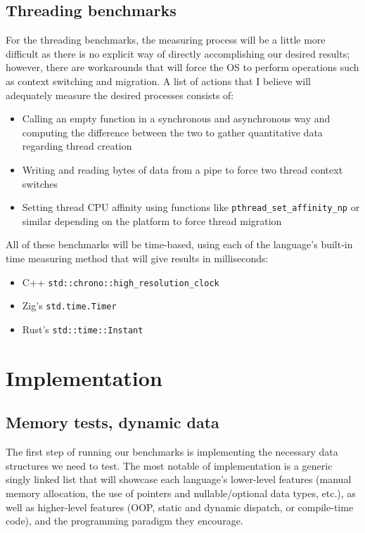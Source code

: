 \documentclass{article}
\begin{document}
\subsection{Threading benchmarks}
For the threading benchmarks, the measuring process will be a little more difficult as there is no explicit way of directly accomplishing our desired results; however, there are workarounds that will force the OS to perform operations such as context switching and migration. A list of actions that I believe will adequately measure the desired processes consists of:
\begin{itemize}
    \item Calling an empty function in a synchronous and asynchronous way and computing the difference between the two to gather quantitative data regarding thread creation
    \item Writing and reading bytes of data from a pipe to force two thread context switches
    \item Setting thread CPU affinity using functions like \texttt{pthread\_set\_affinity\_np} or similar depending on the platform to force thread migration
\end{itemize}

All of these benchmarks will be time-based, using each of the language's built-in time measuring method that will give results in milliseconds:
\begin{itemize}
    \item C++ \texttt{std::chrono::high\_resolution\_clock}
    \item Zig's \texttt{std.time.Timer}
    \item Rust's \texttt{std::time::Instant}
\end{itemize}

\clearpage
\section{Implementation}
\subsection{Memory tests, dynamic data}
The first step of running our benchmarks is implementing the necessary data structures we need to test. The most notable of implementation is a generic singly linked list that will showcase each language's lower-level features (manual memory allocation, the use of pointers and nullable/optional data types, etc.), as well as higher-level features (OOP, static and dynamic dispatch, or compile-time code), and the programming paradigm they encourage.
\end{document}
